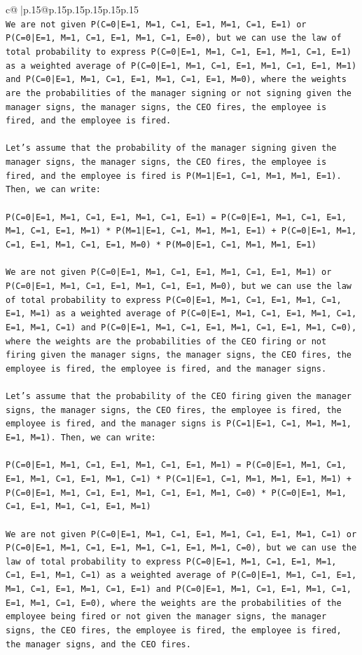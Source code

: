 \documentclass{article}
\begin{document}
{\begin{supertabular}{c@{$\;$}|p{.15\linewidth}@{}p{.15\linewidth}p{.15\linewidth}p{.15\linewidth}p{.15\linewidth}p{.15\linewidth}}
{{{\\ 
\texttt{We are not given P(C=0|E=1, M=1, C=1, E=1, M=1, C=1, E=1) or P(C=0|E=1, M=1, C=1, E=1, M=1, C=1, E=0), but we can use the law of total probability to express P(C=0|E=1, M=1, C=1, E=1, M=1, C=1, E=1) as a weighted average of P(C=0|E=1, M=1, C=1, E=1, M=1, C=1, E=1, M=1) and P(C=0|E=1, M=1, C=1, E=1, M=1, C=1, E=1, M=0), where the weights are the probabilities of the manager signing or not signing given the manager signs, the manager signs, the CEO fires, the employee is fired, and the employee is fired.} \\
\\ 
\texttt{Let's assume that the probability of the manager signing given the manager signs, the manager signs, the CEO fires, the employee is fired, and the employee is fired is P(M=1|E=1, C=1, M=1, M=1, E=1). Then, we can write:} \\
\\ 
\texttt{P(C=0|E=1, M=1, C=1, E=1, M=1, C=1, E=1) = P(C=0|E=1, M=1, C=1, E=1, M=1, C=1, E=1, M=1) * P(M=1|E=1, C=1, M=1, M=1, E=1) + P(C=0|E=1, M=1, C=1, E=1, M=1, C=1, E=1, M=0) * P(M=0|E=1, C=1, M=1, M=1, E=1)} \\
\\ 
\texttt{We are not given P(C=0|E=1, M=1, C=1, E=1, M=1, C=1, E=1, M=1) or P(C=0|E=1, M=1, C=1, E=1, M=1, C=1, E=1, M=0), but we can use the law of total probability to express P(C=0|E=1, M=1, C=1, E=1, M=1, C=1, E=1, M=1) as a weighted average of P(C=0|E=1, M=1, C=1, E=1, M=1, C=1, E=1, M=1, C=1) and P(C=0|E=1, M=1, C=1, E=1, M=1, C=1, E=1, M=1, C=0), where the weights are the probabilities of the CEO firing or not firing given the manager signs, the manager signs, the CEO fires, the employee is fired, the employee is fired, and the manager signs.} \\
\\ 
\texttt{Let's assume that the probability of the CEO firing given the manager signs, the manager signs, the CEO fires, the employee is fired, the employee is fired, and the manager signs is P(C=1|E=1, C=1, M=1, M=1, E=1, M=1). Then, we can write:} \\
\\ 
\texttt{P(C=0|E=1, M=1, C=1, E=1, M=1, C=1, E=1, M=1) = P(C=0|E=1, M=1, C=1, E=1, M=1, C=1, E=1, M=1, C=1) * P(C=1|E=1, C=1, M=1, M=1, E=1, M=1) + P(C=0|E=1, M=1, C=1, E=1, M=1, C=1, E=1, M=1, C=0) * P(C=0|E=1, M=1, C=1, E=1, M=1, C=1, E=1, M=1)} \\
\\ 
\texttt{We are not given P(C=0|E=1, M=1, C=1, E=1, M=1, C=1, E=1, M=1, C=1) or P(C=0|E=1, M=1, C=1, E=1, M=1, C=1, E=1, M=1, C=0), but we can use the law of total probability to express P(C=0|E=1, M=1, C=1, E=1, M=1, C=1, E=1, M=1, C=1) as a weighted average of P(C=0|E=1, M=1, C=1, E=1, M=1, C=1, E=1, M=1, C=1, E=1) and P(C=0|E=1, M=1, C=1, E=1, M=1, C=1, E=1, M=1, C=1, E=0), where the weights are the probabilities of the employee being fired or not given the manager signs, the manager signs, the CEO fires, the employee is fired, the employee is fired, the manager signs, and the CEO fires.} \\
}}}
\end{supertabular}}
\end{document}

